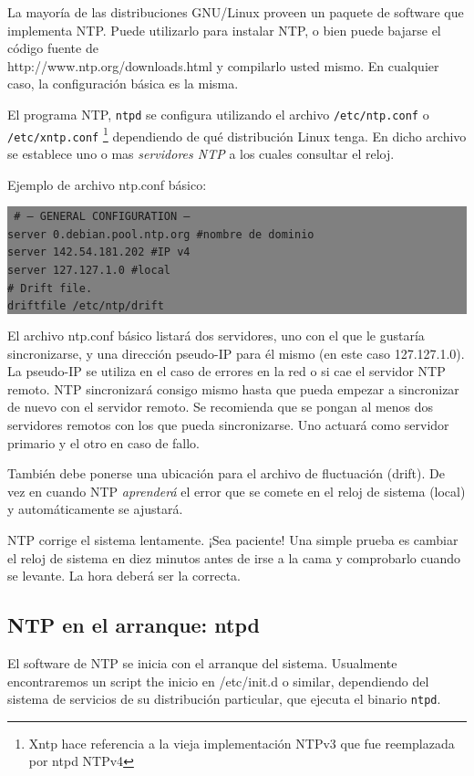\documentclass[12pt]{article}
\begin{document}
La mayoría de las distribuciones GNU/Linux proveen un paquete de software que implementa 
NTP. Puede utilizarlo para instalar NTP, o bien puede bajarse el código fuente de \\
http://www.ntp.org/downloads.html y compilarlo usted mismo. En
cualquier caso, la configuración básica es la misma.

El programa NTP, \texttt{ntpd} se configura utilizando el archivo \texttt{/etc/ntp.conf} o
\texttt{/etc/xntp.conf} \footnote{Xntp hace referencia a la vieja implementación 
NTPv3 que fue reemplazada por ntpd NTPv4} dependiendo de qué distribución Linux tenga. 
En dicho archivo se establece uno o mas \textit{servidores NTP} a los cuales 
consultar el reloj. 

Ejemplo de archivo ntp.conf básico: 

\colorbox{grey}{\parbox[t]{0.95\linewidth}{ \vspace*{0.5cm} {\tt
\# --- GENERAL CONFIGURATION --- \\
server  0.debian.pool.ntp.org \#nombre de dominio \\
server  142.54.181.202 \#IP v4 \\
server  127.127.1.0 \#local \\

\# Drift file.\\
driftfile /etc/ntp/drift
 } \vspace*{0.5cm} } } 

	
El archivo ntp.conf básico listará dos servidores, uno
con el que le gustaría sincronizarse, y una dirección pseudo-IP para él 
mismo (en este caso 127.127.1.0). La pseudo-IP se utiliza en el caso de
errores en la red o si cae el servidor NTP remoto. NTP sincronizará
consigo mismo hasta que pueda empezar a sincronizar de nuevo con el 
servidor remoto. Se recomienda que se pongan al menos dos servidores remotos
con los que pueda sincronizarse. Uno actuará como servidor primario y el 
otro en caso de fallo.

También debe ponerse una ubicación para el archivo de fluctuación (drift). De 
vez en cuando NTP \textit{aprenderá} el error que se comete en el reloj de
sistema (local) y automáticamente se ajustará.

NTP corrige el sistema lentamente. ¡Sea paciente! Una simple prueba es
cambiar el reloj de sistema en diez minutos antes de irse a la cama y
comprobarlo cuando se levante. La hora deberá ser la correcta.

\subsection*{NTP en el arranque: ntpd}
El software de NTP se inicia con el arranque del sistema. Usualmente encontraremos
un script the inicio en /etc/init.d o similar, dependiendo del sistema de servicios 
de su distribución particular, que ejecuta el binario \texttt{ntpd}.
\end{document}
